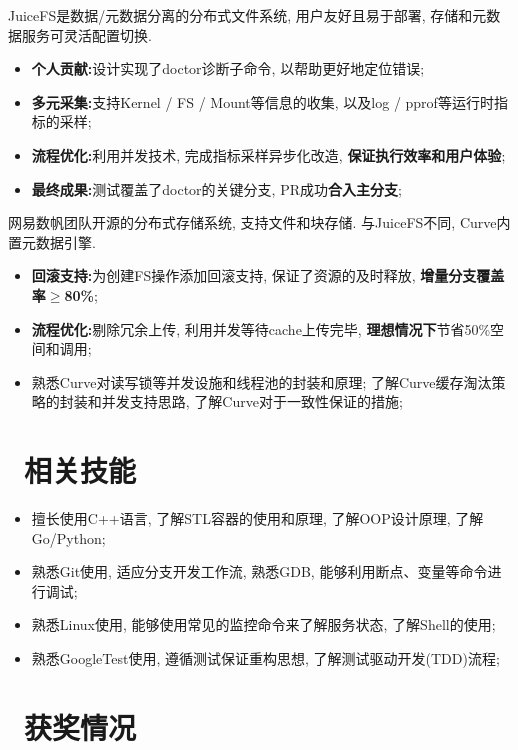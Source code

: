 \documentclass{resume}
\begin{document}
JuiceFS是数据/元数据分离的分布式文件系统, 用户友好且易于部署, 存储和元数据服务可灵活配置切换.
\begin{itemize}[parsep=0.3ex]
  \item \textbf{个人贡献:}设计实现了doctor诊断子命令, 以帮助更好地定位错误;
  \item \textbf{多元采集:}支持Kernel / FS / Mount等信息的收集, 以及log / pprof等运行时指标的采样;
  \item \textbf{流程优化:}利用并发技术, 完成指标采样异步化改造, \textbf{保证执行效率和用户体验};
  \item \textbf{最终成果:}测试覆盖了doctor的关键分支, PR成功\textbf{合入主分支};\enspace{}
\end{itemize}
网易数帆团队开源的分布式存储系统, 支持文件和块存储. 与JuiceFS不同, Curve内置元数据引擎.
\begin{itemize}[parsep=0.3ex]
  \item \textbf{回滚支持:}为创建FS操作添加回滚支持, 保证了资源的及时释放, \textbf{增量分支覆盖率$\geq$80\%};\enspace{}
  \item \textbf{流程优化:}剔除冗余上传, 利用并发等待cache上传完毕, \textbf{理想情况下}节省50\%空间和调用;\enspace{}
  \item 熟悉Curve对读写锁等并发设施和线程池的封装和原理; 了解Curve缓存淘汰策略的封装和并发支持思路, 了解Curve对于一致性保证的措施;
\end{itemize}
\section{\faCogs\ 相关技能}
\begin{itemize}[parsep=0.3ex]
  \item 擅长使用C++语言, 了解STL容器的使用和原理, 了解OOP设计原理, 了解Go/Python;
  \item 熟悉Git使用, 适应分支开发工作流, 熟悉GDB, 能够利用断点、变量等命令进行调试;
  \item 熟悉Linux使用, 能够使用常见的监控命令来了解服务状态, 了解Shell的使用;
  \item 熟悉GoogleTest使用, 遵循测试保证重构思想, 了解测试驱动开发(TDD)流程;
\end{itemize}
\section{\faHeartO\ 获奖情况}
\end{document}
